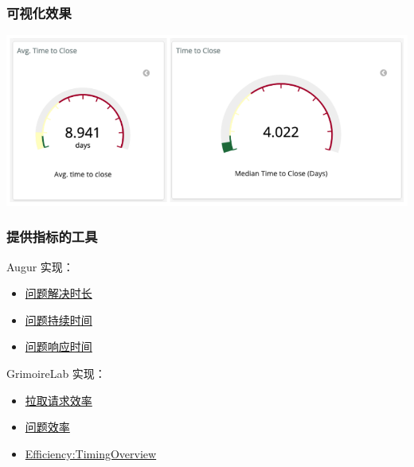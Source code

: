 \hypertarget{ux53efux89c6ux5316ux6548ux679c}{%
\subsubsection{可视化效果}\label{ux53efux89c6ux5316ux6548ux679c}}

\includegraphics{images/time-to-close_1.png}

\hypertarget{ux63d0ux4f9bux6307ux6807ux7684ux5de5ux5177}{%
\subsubsection{提供指标的工具}\label{ux63d0ux4f9bux6307ux6807ux7684ux5de5ux5177}}

Augur 实现：

\begin{itemize}
\tightlist
\item
  \href{http://augur.osshealth.io/api_docs/\#api-Evolution-Closed_Issue_Resolution_Duration(Repo)}{问题解决时长}
\item
  \href{http://augur.osshealth.io/api_docs/\#api-Evolution-issue-duration-repo}{问题持续时间}
\item
  \href{http://augur.osshealth.io/api_docs/\#api-Evolution-Issue_Response_Time(Repo)}{问题响应时间}
\end{itemize}

GrimoireLab 实现：

\begin{itemize}
\tightlist
\item
  \href{https://chaoss.github.io/grimoirelab-sigils/panels/github-pullrequests-efficiency/}{拉取请求效率}
\item
  \href{https://chaoss.github.io/grimoirelab-sigils/panels/github-issues-efficiency/}{问题效率}
\item
  \href{https://chaoss.github.io/grimoirelab-sigils/panels/efficiency-timing-overview/}{Efficiency:TimingOverview}
\end{itemize}

